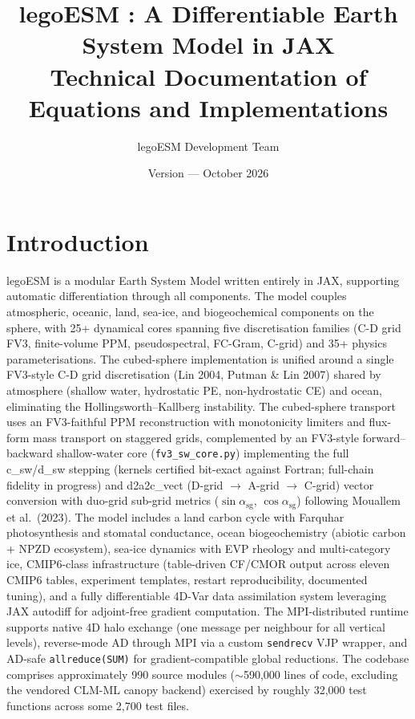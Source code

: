 \documentclass[11pt,a4paper]{article}
\title{\textbf{legoESM \legoesmversion{}: A Differentiable Earth System Model in JAX}\\[6pt]
\large Technical Documentation of Equations and Implementations}
\author{legoESM Development Team}
\date{Version \legoesmversion{} --- October 2026}
\begin{document}
\maketitle
\tableofcontents
\newpage

\section{Introduction}

legoESM is a modular Earth System Model written entirely in JAX, supporting automatic differentiation through all components.  The model couples atmospheric, oceanic, land, sea-ice, and biogeochemical components on the sphere, with 25+ dynamical cores spanning five discretisation families (C-D grid FV3, finite-volume PPM, pseudospectral, FC-Gram, C-grid) and 35+ physics parameterisations.  The cubed-sphere implementation is unified around a single FV3-style C-D grid discretisation (Lin 2004, Putman \& Lin 2007) shared by atmosphere (shallow water, hydrostatic PE, non-hydrostatic CE) and ocean, eliminating the Hollingsworth--Kallberg instability.  The cubed-sphere transport uses an FV3-faithful PPM reconstruction with monotonicity limiters and flux-form mass transport on staggered grids, complemented by an FV3-style forward--backward shallow-water core (\texttt{fv3\_sw\_core.py}) implementing the full c\_sw/d\_sw stepping (kernels certified bit-exact against Fortran; full-chain fidelity in progress) and d2a2c\_vect (D-grid $\to$ A-grid $\to$ C-grid) vector conversion with duo-grid sub-grid metrics ($\sin\alpha_{\mathrm{sg}}$, $\cos\alpha_{\mathrm{sg}}$) following Mouallem et al.\ (2023).  The model includes a land carbon cycle with Farquhar photosynthesis and stomatal conductance, ocean biogeochemistry (abiotic carbon + NPZD ecosystem), sea-ice dynamics with EVP rheology and multi-category ice, CMIP6-class infrastructure (table-driven CF/CMOR output across eleven CMIP6 tables, experiment templates, restart reproducibility, documented tuning), and a fully differentiable 4D-Var data assimilation system leveraging JAX autodiff for adjoint-free gradient computation.  The MPI-distributed runtime supports native 4D halo exchange (one message per neighbour for all vertical levels), reverse-mode AD through MPI via a custom \texttt{sendrecv} VJP wrapper, and AD-safe \texttt{allreduce(SUM)} for gradient-compatible global reductions.  The codebase comprises approximately 990 source modules (${\sim}$590,000 lines of code, excluding the vendored CLM-ML canopy backend) exercised by roughly 32,000 test functions across some 2,700 test files.
\end{document}
